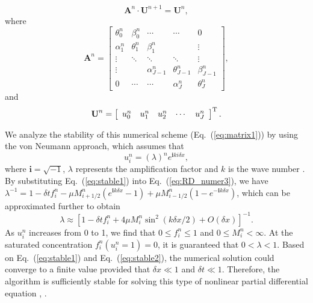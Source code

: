 \documentclass[jkps,preprint,fleqn,showpacs,showkeys]{revtex4}
\newcommand{\eq}[1]{Eq.~(\ref{#1})}
\newcommand{\Order}[1]{O(#1)}
\begin{document}
\begin{equation}\label{eq:matrix_eq}
\textbf{A}^n \cdot \textbf{U}^{n+1} = \textbf{U}^{n},
\end{equation}
where
\begin{equation}\label{eq:matrix_M}
\textbf{A}^n = \left[
\begin{array}{ccccc}
\theta^n_0 & \beta^n_0      & \cdots             &  \cdots        & 0 \\
\alpha^n_1 & \theta^n_1      & \beta^n_1          &            	   & \vdots \\
\vdots     & \ddots           & \ddots             &  \ddots        &  \vdots    \\
\vdots     &                  & \alpha^n_{J-1}   & \theta^n_{J-1}  & \beta^n_{J-1} \\
0          & \cdots	          &      \cdots       & \alpha^n_{J}  & \theta^n_{J}                                 \end{array} 
\right],
\end{equation}
and
\begin{equation}\label{eq:matrix_U}
\textbf{U}^{n} = \left[
\begin{array}{cccccc}
u^{n}_0 & u^{n}_1 & u^{n}_2 & \cdots & u^{n}_{J}
\end{array} 
\right]^{\textnormal{T}} .
\end{equation}

We analyze the stability of this numerical scheme (\eq{eq:matrix1}) by using the von Neumann approach, which assumes that
\begin{equation}\label{eq:stable1}
u^n_i = \left(\lambda\right)^n e^{\mathbf{i}ki\delta x},
\end{equation}
where $\mathbf{i} = \sqrt{-1}$, $\lambda$ represents the amplification factor and $k$ is the wave number \cite{NumericalRecipes}. By substituting \eq{eq:stable1} into \eq{eq:RD_numer3}, we have $\lambda^{-1} = 1 -\delta t f^n_i - \mu M^n_{i+1/2}\left(e^{\mathbf{i}k\delta x}-1\right) + \mu M^n_{i-1/2}\left(1-e^{-\mathbf{i}k\delta x}\right)$, which can be approximated further to obtain 
\begin{equation}\label{eq:stable2}
\lambda \approx \left[ 1 -\delta t f^n_i + 4\mu M^n_i \sin^2\left(k\delta x/2\right) + \Order{\delta x}\right]^{-1}.
\end{equation}
As $u^n_i$ increases from 0 to 1, we find that $0 \leq f^n_i \leq 1$ and $0 \leq M^n_i < \infty$. At the saturated concentration $f^n_i(u^n_i=1) = 0$, it is guaranteed that $0 < \lambda < 1$. Based on \eq{eq:stable1} and \eq{eq:stable2}, the numerical solution could converge to a finite value provided that $\delta x \ll 1$ and $\delta t \ll 1$. Therefore, the algorithm is sufficiently stable for solving this type of nonlinear partial differential equation \cite{Eberl2007}, \cite{Ngamsaad2016}.


\end{document}
